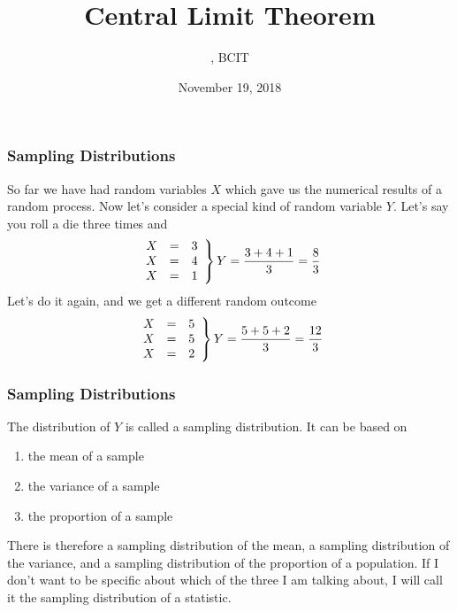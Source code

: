 \documentclass[xcolor=dvipsnames]{beamer}
\title{Central Limit Theorem}
\subtitle{{\CourseNumber}, BCIT}
\author{\CourseName}
\date{November 19, 2018}
\begin{document}
\begin{frame}
  \titlepage
\end{frame}

\begin{frame}
  \frametitle{Sampling Distributions}
So far we have had random variables $X$ which gave us the numerical
results of a random process. Now let's consider a special kind of
random variable $Y$. Let's say you roll a die three times and
\begin{equation}
  \label{eq:quaegieg}
  \left.\begin{array}{rcl}
    X&=&3 \\
    X&=&4 \\
    X&=&1
  \end{array}\right\}Y=\frac{3+4+1}{3}=\frac{8}{3}\notag
\end{equation}
Let's do it again, and we get a different random outcome
\begin{equation}
  \label{eq:iitiloox}
  \left.\begin{array}{rcl}
    X&=&5 \\
    X&=&5 \\
    X&=&2
  \end{array}\right\}Y=\frac{5+5+2}{3}=\frac{12}{3}\notag
\end{equation}
\end{frame}

\begin{frame}
  \frametitle{Sampling Distributions}
The distribution of $Y$ is called a \alert{sampling distribution}. It
can be based on 
\begin{enumerate}
\item the \alert{mean} of a sample
\item the \alert{variance} of a sample
\item the \alert{proportion} of a sample
\end{enumerate}
There is therefore a sampling distribution of the mean, a sampling
distribution of the variance, and a sampling distribution of the
proportion of a population. If I don't want to be specific about which
of the three I am talking about, I will call it the sampling
distribution of a \alert{statistic}.
\end{frame}
\end{document}
